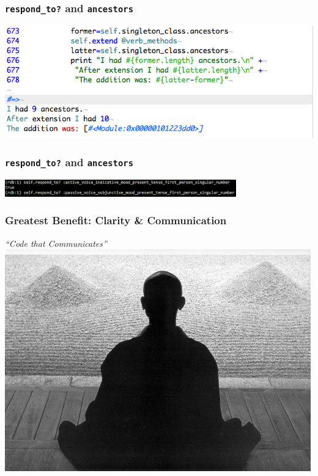 \documentclass[slidestop,compress,mathserif]{beamer}
\begin{document}
\begin{frame}
	\frametitle{\texttt{respond\_to?} and \texttt{ancestors}}
	\includegraphics[scale=0.45]{img/method_chain_first.png}
\end{frame}

\begin{frame}
	\frametitle{\texttt{respond\_to?} and \texttt{ancestors}}
	\includegraphics[width=10cm, height=0.75cm]{img/respond_to_well.png}
\end{frame}

\begin{frame}
	\frametitle{Greatest Benefit: Clarity \& Communication}
	\begin{center}
		\emph{``Code that Communicates''}
		\includegraphics[scale=0.45]{img/Zen04.jpg}
	\end{center}
\end{frame}
\end{document}
